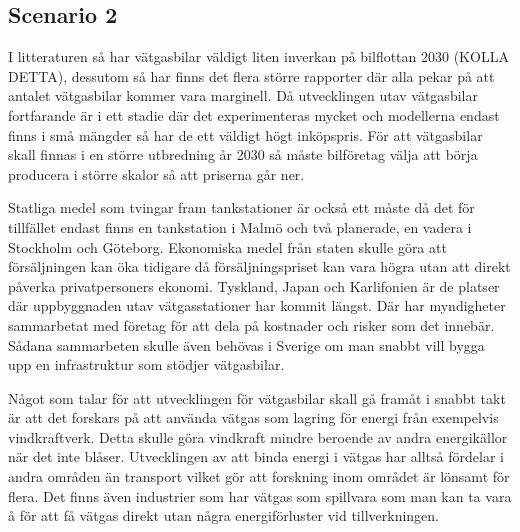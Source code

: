 \documentclass[a4paper,11pt,fleqn, titlepage]{article}
\begin{document}
\subsection{Scenario 2}
I litteraturen så har vätgasbilar väldigt liten inverkan på bilflottan 2030 (KOLLA DETTA), dessutom så har finns det flera större rapporter där alla pekar på att antalet vätgasbilar kommer vara marginell.
Då utvecklingen utav vätgasbilar fortfarande är i ett stadie där det experimenteras mycket och modellerna endast finns i små mängder så har de ett väldigt högt inköpspris. För att vätgasbilar skall finnas i en större utbredning år 2030 så måste bilföretag välja att börja producera i större skalor så att priserna går ner.

Statliga medel som tvingar fram tankstationer är också ett måste då det för tillfället endast finns en tankstation i Malmö och två planerade, en vadera i Stockholm och Göteborg.
Ekonomiska medel från staten skulle göra att försäljningen kan öka tidigare då försäljningspriset kan vara högra utan att direkt påverka privatpersoners ekonomi.
Tyskland, Japan och Karlifonien är de platser där uppbyggnaden utav vätgasstationer har kommit längst. Där har myndigheter sammarbetat med företag för att dela på kostnader och risker som det innebär. Sådana sammarbeten skulle även behövas i Sverige om man snabbt vill bygga upp en infrastruktur som stödjer vätgasbilar.

Något som talar för att utvecklingen för vätgasbilar skall gå framåt i snabbt takt är att det forskars på att använda vätgas som lagring för energi från exempelvis vindkraftverk. Detta skulle göra vindkraft mindre beroende av andra energikällor när det inte blåser. Utvecklingen av att binda energi i vätgas har alltså fördelar i andra områden än transport vilket gör att forskning inom området är lönsamt för flera. Det finns även industrier som har vätgas som spillvara som man kan ta vara å för att få vätgas direkt utan några energiförluster vid tillverkningen.


\printbibliography
\end{document}
